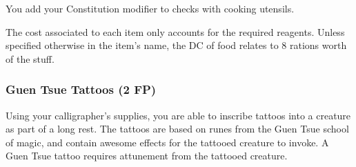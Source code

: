     You add your Constitution modifier to checks with cooking utensils.

    The cost associated to each item only accounts for the required reagents.
    Unless specified otherwise in the item's name, the DC of food relates to 8 rations worth of the stuff.
\subsubsection{Guen Tsue Tattoos (2 FP)} \label{feat::guentsuetattoos}
    Using your calligrapher's supplies, you are able to inscribe tattoos into a creature as part of a long rest.
    The tattoos are based on runes from the Guen Tsue school of magic, and contain awesome effects for the tattooed creature to invoke.
    A Guen Tsue tattoo requires attunement from the tattooed creature.

